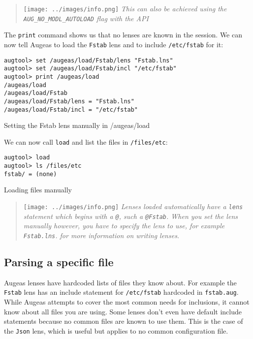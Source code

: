 \begin{quote}
\texttt{[image: ../images/info.png]} \emph{This can also be achieved using the \texttt{AUG\_NO\_MODL\_AUTOLOAD} flag with the API}

\end{quote}
The \verb!print! command shows us that no lenses are known in the session. We can now tell Augeas to load the \verb!Fstab! lens and to include \nolinkurl{/etc/fstab} for it:

 

\begin{listing}
  \begin{verbatim}
augtool> set /augeas/load/Fstab/lens "Fstab.lns"
augtool> set /augeas/load/Fstab/incl "/etc/fstab"
augtool> print /augeas/load
/augeas/load
/augeas/load/Fstab
/augeas/load/Fstab/lens = "Fstab.lns"
/augeas/load/Fstab/incl = "/etc/fstab"
  \end{verbatim}
  \caption{Setting the Fstab lens manually in /augeas/load}
  \label{lst:metadata_setting_lens_manually}
\end{listing}

We can now call \verb!load! and list the files in \nolinkurl{/files/etc}:

 

\begin{listing}
  \begin{verbatim}
augtool> load
augtool> ls /files/etc
fstab/ = (none)
  \end{verbatim}
  \caption{Loading files manually}
  \label{lst:metadata_call_load}
\end{listing}

\begin{quote}
\texttt{[image: ../images/info.png]} \emph{Lenses loaded automatically have a \texttt{lens} statement which begins with a \texttt{@}, such a \texttt{@Fstab}. When you set the lens manually however, you have to specify the lens to use, for example \texttt{Fstab.lns}.  for more information on writing lenses.}

\end{quote}
\subsection{Parsing a specific file}

Augeas lenses have hardcoded lists of files they know about. For example the \verb!Fstab! lens has an include statement for \nolinkurl{/etc/fstab} hardcoded in \verb!fstab.aug!. While Augeas attempts to cover the most common needs for inclusions, it cannot know about all files you are using. Some lenses don't even have default include statements because no common files are known to use them. This is the case of the \verb!Json! lens, which is useful but applies to no common configuration file.

